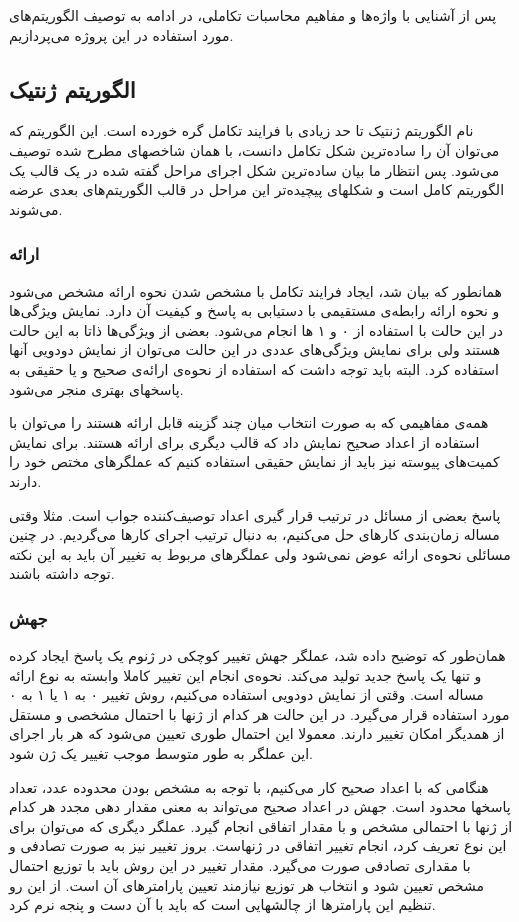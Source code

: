\documentclass{report}
\begin{document}
پس از آشنایی با واژه‌ها و مفاهیم محاسبات تکاملی، در ادامه به توصیف الگوریتم‌های مورد استفاده در این پروژه می‌پردازیم.

\subsection{الگوریتم ژنتیک}
نام الگوریتم ژنتیک تا حد زیادی با فرایند تکامل گره خورده است. این الگوریتم که می‌توان آن را ساده‌ترین شکل تکامل دانست، با همان شاخصهای مطرح شده توصیف می‌شود. پس انتظار ما بیان ساده‌ترین شکل اجرای مراحل گفته شده در یک قالب یک الگوریتم کامل است و شکلهای پیچیده‌تر این مراحل در قالب الگوریتم‌های بعدی عرضه می‌شوند.

\subsubsection{ارائه}
همانطور که بیان شد، ایجاد فرایند تکامل با مشخص شدن نحوه ارائه مشخص می‌شود و نحوه ارائه رابطه‌ی مستقیمی با دستیابی به پاسخ و کیفیت آن دارد. نمایش ویژگی‌ها در این حالت با استفاده از ۰ و ۱ ها انجام می‌شود. بعضی از ویژگی‌ها ذاتا به این حالت هستند ولی برای نمایش ویژگی‌های عددی در این حالت می‌توان از نمایش دودویی آنها استفاده کرد. البته باید توجه داشت که استفاده از نحوه‌ی ارائه‌ی صحیح و یا حقیقی به پاسخهای بهتری منجر می‌شود.

همه‌ی مفاهیمی که به صورت انتخاب میان چند گزینه قابل ارائه هستند را می‌توان با استفاده از اعداد صحیح نمایش داد که قالب دیگری برای ارائه هستند. برای نمایش کمیت‌های پیوسته نیز باید از نمایش حقیقی استفاده کنیم که عملگرهای مختص خود را دارند.

پاسخ بعضی از مسائل در ترتیب قرار گیری اعداد توصیف‌کننده جواب است. مثلا وقتی مساله زمان‌بندی کارهای حل می‌کنیم، به دنبال ترتیب اجرای کارها می‌گردیم. در چنین مسائلی نحوه‌ی ارائه عوض نمی‌شود ولی عملگرهای مربوط به تغییر آن باید به این نکته توجه داشته باشند.

\subsubsection{جهش}
همان‌طور که توضیح داده شد، عملگر جهش تغییر کوچکی در ژنوم یک پاسخ ایجاد کرده و تنها یک پاسخ جدید تولید می‌کند. نحوه‌ی انجام این تغییر کاملا وابسته به نوع ارائه مساله است. وقتی از نمایش دودویی استفاده می‌کنیم، روش تغییر ۰ به ۱ یا ۱ به ۰ مورد استفاده قرار می‌گیرد. در این حالت هر کدام از ژنها با احتمال مشخصی و مستقل از همدیگر امکان تغییر دارند. معمولا این احتمال طوری تعیین می‌شود که هر بار اجرای این عملگر به طور متوسط موجب تغییر یک ژن شود.

هنگامی که با اعداد صحیح کار می‌کنیم، با توجه به مشخص بودن محدوده عدد، تعداد پاسخها محدود است. جهش در اعداد صحیح می‌تواند به معنی مقدار دهی مجدد هر کدام از ژنها با احتمالی مشخص و با مقدار اتفاقی انجام گیرد. عملگر دیگری که می‌توان برای این نوع تعریف کرد، انجام تغییر اتفاقی در ژنهاست. بروز تغییر نیز به صورت تصادفی و با مقداری تصادفی صورت می‌گیرد. مقدار تغییر در این روش باید با توزیع احتمال مشخص تعیین شود و انتخاب هر توزیع نیازمند تعیین پارامترهای آن است. از این رو تنظیم این پارامترها از چالشهایی است که باید با آن دست و پنجه نرم کرد.
\end{document}
